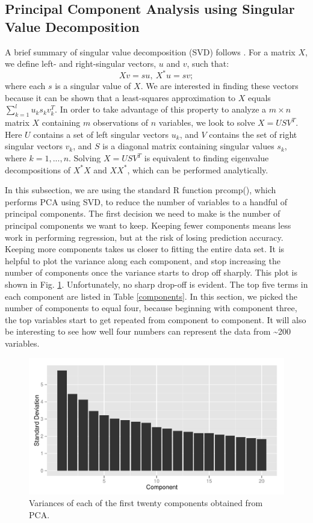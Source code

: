 \subsection{Principal Component Analysis using Singular Value Decomposition}
A brief summary of singular value decomposition (SVD) follows \cite{berrar}. For a matrix $X$, we define left- and right-singular vectors, $u$ and $v$, such that:
\begin{equation}
Xv=su,~X^*u = sv;
\end{equation}
where each $s$ is a singular value of $X$. We are interested in finding these vectors because it can be shown that a least-squares approximation to $X$ equals $\sum_{k=1}^{l}u_ks_kv_k^T$. In order to take advantage of this property to analyze a $m\times n$ matrix $X$ containing $m$ observations of $n$ variables, we look to solve $X = USV^T$. Here $U$ contains a set of left singular vectors $u_k$, and $V$ contains the set of right singular vectors $v_k$, and $S$ is a diagonal matrix containing singular values $s_k$, where $k = 1, ..., n$. Solving $X = USV^T$ is equivalent to finding eigenvalue decompositions of $X^*X$ and $XX^*$, which can be performed analytically. 

In this subsection, we are using the standard R function prcomp(), which performs PCA using SVD, to reduce the number of variables to a handful of principal components. The first decision we need to make is the number of principal components we want to keep. Keeping fewer components means less work in performing regression, but at the risk of losing prediction accuracy. Keeping more components takes us closer to fitting the entire data set. It is helpful to plot the variance along each component, and stop increasing the number of components once the variance starts to drop off sharply. This plot is shown in Fig. \ref{variances}. Unfortunately, no sharp drop-off is evident. The top five terms in each component are listed in Table \ref{components}. In this section, we picked the number of components to equal four, because beginning with component three, the top variables start to get repeated from component to component. It will also be interesting to see how well four numbers can represent the data from \textasciitilde 200 variables. 

\begin{figure}
\centering
\includegraphics[scale=0.65]{components.pdf}
\caption{Variances of each of the first twenty components obtained from PCA.}
\label{variances}
\end{figure}


